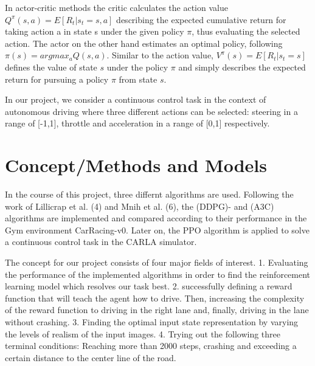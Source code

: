\documentclass[letterpaper, 10 pt, conference]{ieeeconf}  %
\begin{document}
In actor-critic methods the critic calculates the action value $Q^\pi(s,a) = E[R_t|s_t=s,a]$ describing the expected cumulative return for taking action a in state s under the given policy $\pi$, thus evaluating the selected action. The actor on the other hand estimates an optimal policy, following $\pi(s) = argmax_aQ(s,a)$. Similar to the action value, $V^\pi(s) = E[R_t|s_t=s]$ defines the value of state $s$ under the policy $\pi$ and simply describes the expected return for pursuing a policy $\pi$ from state $s$.

In our project, we consider a continuous control task in the context of autonomous driving where three different actions can be selected: steering in a range of [-1,1], throttle  and acceleration in a range of [0,1] respectively.

\section{Concept/Methods and Models}

In the course of this project, three differnt algorithms are used. Following the work of Lillicrap et al. (4) and Mnih et al. (6), the (DDPG)- and (A3C) algorithms are implemented and compared according to their performance in the Gym environment CarRacing-v0. Later on, the PPO algorithm is applied to solve a continuous control task in the CARLA simulator.

The concept for our project consists of four major fields of interest. 1. Evaluating the performance of the implemented algorithms in order to find the reinforcement learning model which resolves our task best. 2. successfully defining a reward function that will teach the agent how to drive. Then, increasing the complexity of the reward function to driving in the right lane and, finally, driving in the lane without crashing. 3. Finding the optimal input state representation by varying the levels of realism of the input images. 4. Trying out the following three terminal conditions: Reaching more than 2000 steps, crashing and exceeding a certain distance to the center line of the road.
\end{document}
